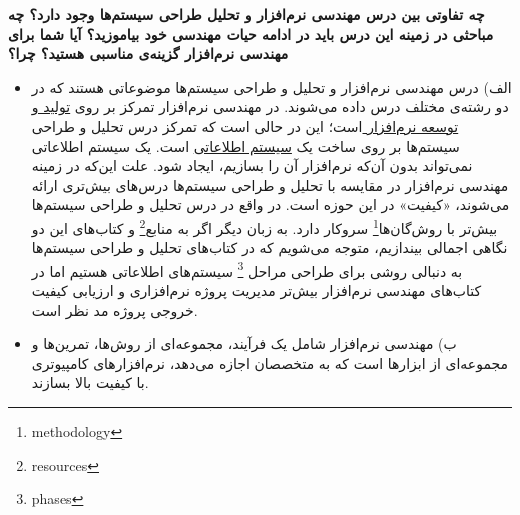 




	\textbf{چه تفاوتی بین درس مهندسی نرم‌افزار و تحلیل طراحی سیستم‌ها وجود دارد؟ چه مباحثی در زمینه این درس باید در ادامه حیات مهندسی خود بیاموزید؟ آیا شما برای مهندسی نرم‌افزار گزینه‌ی مناسبی هستید؟ چرا؟}
	


\begin{itemize}
	\item 
	الف)‌ درس مهندسی نرم‌افزار و تحلیل و طراحی سیستم‌ها موضوعاتی هستند که در دو رشته‌ی مختلف درس داده می‌شوند. در مهندسی نرم‌افزار تمرکز بر روی \underline{تولید و توسعه نرم‌افزار }است؛ این در حالی است که تمرکز درس تحلیل و طراحی سیستم‌ها بر روی ساخت یک \underline{سیستم اطلاعاتی} است. یک سیستم اطلاعاتی نمی‌تواند بدون آن‌که نرم‌افزار آن را بسازیم، ایجاد شود. علت این‌که در زمینه مهندسی نرم‌افزار در مقایسه با تحلیل و طراحی سیستم‌ها درس‌های بیش‌تری ارائه می‌شوند، «کیفیت» در این حوزه است. در واقع در درس تحلیل و طراحی سیستم‌ها بیش‌تر با روش‌گان‌ها\footnote{methodology} سروکار دارد. به زبان دیگر اگر به منابع\footnote{resources} و کتاب‌های این دو نگاهی اجمالی بیندازیم، متوجه می‌شویم که در کتاب‌های تحلیل و طراحی سیستم‌ها به دنبالی روشی برای طراحی مراحل \footnote{phases} سیستم‌های اطلاعاتی هستیم اما در کتاب‌های مهندسی نرم‌افزار بیش‌تر مدیریت پروژه نرم‌افزاری و ارزیابی کیفیت خروجی پروژه مد نظر است.
	\item 
ب) 	مهندسی نرم‌افزار شامل یک فرآیند، مجموعه‌ای از روش‌ها، تمرین‌ها و مجموعه‌ای از ابزارها است که به متخصصان اجازه می‌دهد، نرم‌افزارهای کامپیوتری با کیفیت بالا بسازند.


\end{itemize}
